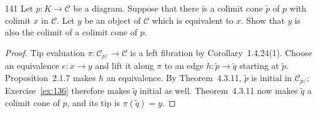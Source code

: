 \begin{exercise}{141}
Let $p\colon K\to\mathcal C$ be a diagram. Suppose that there is a colimit cone $\tilde p$ of $p$ with
colimit $x$ in $\mathcal C$. Let $y$ be an object of $\mathcal C$ which is equivalent to $x$. Show that $y$ is also the colimit
of a colimit cone of $p$.

\begin{proof}
Tip evaluation $\pi\colon\mathcal C_{p/}\to\mathcal C$ is a left
fibration by Corollary~1.4.24(1).
Choose an equivalence $e\colon x\to y$ and lift it along $\pi$ to an
edge $h\colon\tilde p\to\tilde q$ starting at $\tilde p$.
Proposition~2.1.7 makes $h$ an equivalence.
By Theorem~4.3.11, $\tilde p$ is initial in $\mathcal C_{p/}$;
Exercise~\ref{ex:136} therefore makes $\tilde q$ initial as well.
Theorem~4.3.11 now makes $\tilde q$ a colimit cone of $p$,
and its tip is $\pi(\tilde q)=y$.
\end{proof}
\end{exercise}
